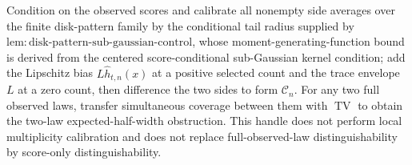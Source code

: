 Condition on the observed scores and calibrate all nonempty side averages over the finite disk-pattern family by the conditional tail radius supplied by \(\mathrm{lem:disk\text{-}pattern\text{-}sub\text{-}gaussian\text{-}control}\), whose moment-generating-function bound is derived from the centered score-conditional sub-Gaussian kernel condition; add the Lipschitz bias \(L\widehat h_{t,n}(x)\) at a positive selected count and the trace envelope \(L\) at a zero count, then difference the two sides to form \(\mathcal C_n\). For any two full observed laws, transfer simultaneous coverage between them with \(\operatorname{TV}\) to obtain the two-law expected-half-width obstruction. This handle does not perform local multiplicity calibration and does not replace full-observed-law distinguishability by score-only distinguishability.